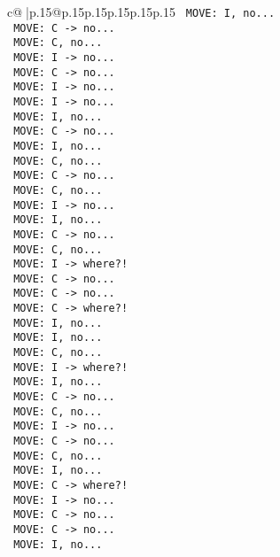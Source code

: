 \documentclass{article}
\begin{document}
{\begin{supertabular}{c@{$\;$}|p{.15\linewidth}@{}p{.15\linewidth}p{.15\linewidth}p{.15\linewidth}p{.15\linewidth}p{.15\linewidth}}
{{{\texttt{ MOVE: I, no...} \\
\texttt{ MOVE: C {-}> no...} \\
\texttt{ MOVE: C, no...} \\
\texttt{ MOVE: I {-}> no...} \\
\texttt{ MOVE: C {-}> no...} \\
\texttt{ MOVE: I {-}> no...} \\
\texttt{ MOVE: I {-}> no...} \\
\texttt{ MOVE: I, no...} \\
\texttt{ MOVE: C {-}> no...} \\
\texttt{ MOVE: I, no...} \\
\texttt{ MOVE: C, no...} \\
\texttt{ MOVE: C {-}> no...} \\
\texttt{ MOVE: C, no...} \\
\texttt{ MOVE: I {-}> no...} \\
\texttt{ MOVE: I, no...} \\
\texttt{ MOVE: C {-}> no...} \\
\texttt{ MOVE: C, no...} \\
\texttt{ MOVE: I {-}> where?!} \\
\texttt{ MOVE: C {-}> no...} \\
\texttt{ MOVE: C {-}> no...} \\
\texttt{ MOVE: C {-}> where?!} \\
\texttt{ MOVE: I, no...} \\
\texttt{ MOVE: I, no...} \\
\texttt{ MOVE: C, no...} \\
\texttt{ MOVE: I {-}> where?!} \\
\texttt{ MOVE: I, no...} \\
\texttt{ MOVE: C {-}> no...} \\
\texttt{ MOVE: C, no...} \\
\texttt{ MOVE: I {-}> no...} \\
\texttt{ MOVE: C {-}> no...} \\
\texttt{ MOVE: C, no...} \\
\texttt{ MOVE: I, no...} \\
\texttt{ MOVE: C {-}> where?!} \\
\texttt{ MOVE: I {-}> no...} \\
\texttt{ MOVE: C {-}> no...} \\
\texttt{ MOVE: C {-}> no...} \\
\texttt{ MOVE: I, no...} \\
}}}
\end{supertabular}}
\end{document}
